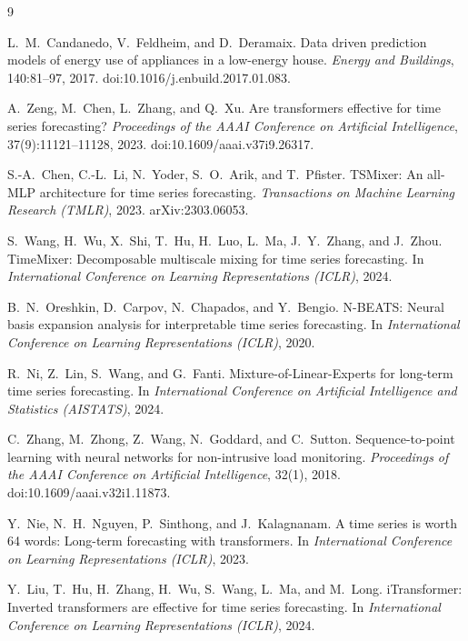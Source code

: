 \documentclass{article}
\begin{document}
\begin{thebibliography}{9}

L.\ M.\ Candanedo, V.\ Feldheim, and D.\ Deramaix.
\newblock Data driven prediction models of energy use of appliances in a
  low-energy house.
\newblock \emph{Energy and Buildings}, 140:81--97, 2017.
\newblock doi:10.1016/j.enbuild.2017.01.083.

A.\ Zeng, M.\ Chen, L.\ Zhang, and Q.\ Xu.
\newblock Are transformers effective for time series forecasting?
\newblock \emph{Proceedings of the AAAI Conference on Artificial
  Intelligence}, 37(9):11121--11128, 2023.
\newblock doi:10.1609/aaai.v37i9.26317.

S.-A.\ Chen, C.-L.\ Li, N.\ Yoder, S.\ O.\ Arik, and T.\ Pfister.
\newblock TSMixer: An all-MLP architecture for time series forecasting.
\newblock \emph{Transactions on Machine Learning Research (TMLR)}, 2023.
\newblock arXiv:2303.06053.

S.\ Wang, H.\ Wu, X.\ Shi, T.\ Hu, H.\ Luo, L.\ Ma, J.\ Y.\ Zhang,
  and J.\ Zhou.
\newblock TimeMixer: Decomposable multiscale mixing for time series
  forecasting.
\newblock In \emph{International Conference on Learning Representations
  (ICLR)}, 2024.

B.\ N.\ Oreshkin, D.\ Carpov, N.\ Chapados, and Y.\ Bengio.
\newblock N-BEATS: Neural basis expansion analysis for interpretable
  time series forecasting.
\newblock In \emph{International Conference on Learning Representations
  (ICLR)}, 2020.

R.\ Ni, Z.\ Lin, S.\ Wang, and G.\ Fanti.
\newblock Mixture-of-Linear-Experts for long-term time series
  forecasting.
\newblock In \emph{International Conference on Artificial Intelligence
  and Statistics (AISTATS)}, 2024.

C.\ Zhang, M.\ Zhong, Z.\ Wang, N.\ Goddard, and C.\ Sutton.
\newblock Sequence-to-point learning with neural networks for
  non-intrusive load monitoring.
\newblock \emph{Proceedings of the AAAI Conference on Artificial
  Intelligence}, 32(1), 2018.
\newblock doi:10.1609/aaai.v32i1.11873.

Y.\ Nie, N.\ H.\ Nguyen, P.\ Sinthong, and J.\ Kalagnanam.
\newblock A time series is worth 64 words: Long-term forecasting with
  transformers.
\newblock In \emph{International Conference on Learning Representations
  (ICLR)}, 2023.

Y.\ Liu, T.\ Hu, H.\ Zhang, H.\ Wu, S.\ Wang, L.\ Ma, and M.\ Long.
\newblock iTransformer: Inverted transformers are effective for time
  series forecasting.
\newblock In \emph{International Conference on Learning Representations
  (ICLR)}, 2024.

\end{thebibliography}
\end{document}

